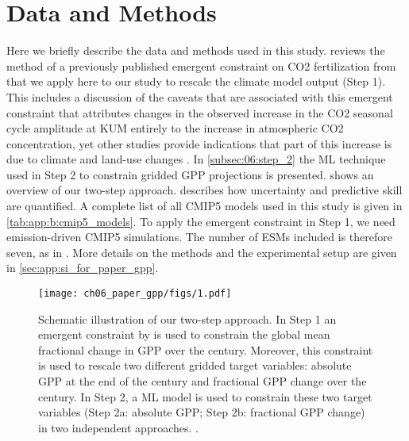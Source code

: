 \section{Data and Methods}
\label{sec:06:data_and_methods}

Here we briefly describe the data and methods used in this study.
 reviews the method of a previously published emergent
constraint on \ac{CO2} fertilization from \textcite{Wenzel2016} that we apply
here to our study to rescale the climate model output (Step 1). This includes a
discussion of the caveats that are associated with this emergent constraint
that attributes changes in the observed increase in the \ac{CO2} seasonal cycle
amplitude at \ac{KUM} entirely to the increase in atmospheric \ac{CO2}
concentration, yet other studies provide indications that part of this increase
is due to climate and land-use changes \autocite{Bastos2019, Forkel2016,
  Piao2018, Zhao2016}. In \cref{subsec:06:step_2} the \ac{ML} technique used in
Step 2 to constrain gridded \ac{GPP} projections is presented.
 shows an overview of our two-step approach.
 describes how uncertainty and predictive
skill are quantified. A complete list of all \acs{CMIP}5 models used in this
study is given in \cref{tab:app:b:cmip5_models}. To apply the emergent
constraint in Step 1, we need emission-driven \acs{CMIP}5 simulations. The
number of \acp{ESM} included is therefore seven, as in \textcite{Wenzel2016}.
More details on the methods and the experimental setup are given in
\cref{sec:app:si_for_paper_gpp}.

\begin{figure}[t]
  \centering
  \texttt{[image: ch06\_paper\_gpp/figs/1.pdf]}
  \caption[
    Schematic illustration of our two-step approach.
  ]{
    Schematic illustration of our two-step approach. In Step 1 an emergent
    constraint by \textcite{Wenzel2016} is used to constrain the global mean
    fractional change in \acf{GPP} over the  century. Moreover, this
    constraint is used to rescale two different gridded target variables:
    absolute \acs{GPP} at the end of the  century and fractional
    \acs{GPP} change over the  century. In Step 2, a \acl{ML} model is
    used to constrain these two target variables (Step 2a: absolute \acs{GPP};
    Step 2b: fractional \acs{GPP} change) in two independent approaches.
    .
  }
  \label{fig:06:schematic_steps}
\end{figure}


